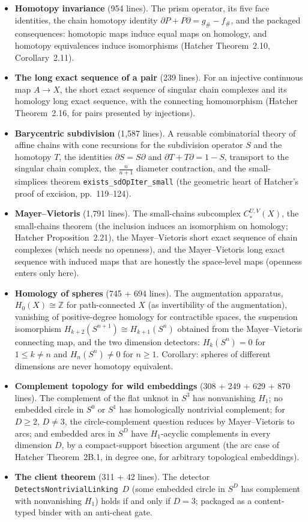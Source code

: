 \documentclass[11pt]{article}
\theoremstyle{remark}
\newcommand{\Z}{\mathbb{Z}}
\newcommand{\leanname}[1]{\texttt{#1}}
\begin{document}
\begin{itemize}
\item \textbf{Homotopy invariance} (954 lines). The prism operator, its five
  face identities, the chain homotopy identity
  $\partial P + P\partial = g_\# - f_\#$, and the packaged consequences:
  homotopic maps induce equal maps on homology, and homotopy equivalences
  induce isomorphisms (Hatcher Theorem~2.10, Corollary~2.11).
\item \textbf{The long exact sequence of a pair} (239 lines). For an
  injective continuous map $A \to X$, the short exact sequence of singular
  chain complexes and its homology long exact sequence, with the connecting
  homomorphism (Hatcher Theorem~2.16, for pairs presented by injections).
\item \textbf{Barycentric subdivision} (1{,}587 lines). A reusable
  combinatorial theory of affine chains with cone recursions for the
  subdivision operator $S$ and the homotopy $T$, the identities
  $\partial S = S \partial$ and $\partial T + T\partial = 1 - S$, transport
  to the singular chain complex, the $\tfrac{n}{n+1}$ diameter contraction,
  and the small-simplices theorem \leanname{exists\_sdOpIter\_small}
  (the geometric heart of Hatcher's proof of excision, pp.~119--124).
\item \textbf{Mayer--Vietoris} (1{,}791 lines). The small-chains subcomplex
  $C^{U,V}_*(X)$, the small-chains theorem (the inclusion induces an
  isomorphism on homology; Hatcher Proposition~2.21), the Mayer--Vietoris
  short exact sequence of chain complexes (which needs no openness), and the
  Mayer--Vietoris long exact sequence with induced maps that are honestly the
  space-level maps (openness enters only here).
\item \textbf{Homology of spheres} (745 + 694 lines). The augmentation
  apparatus, $H_0(X) \cong \Z$ for path-connected $X$ (as invertibility of
  the augmentation), vanishing of positive-degree homology for contractible
  spaces, the suspension isomorphism
  $H_{k+2}(S^{n+1}) \cong H_{k+1}(S^{n})$ obtained from the Mayer--Vietoris
  connecting map, and the two dimension detectors: $H_k(S^n) = 0$ for
  $1 \le k \ne n$ and $H_n(S^n) \ne 0$ for $n \ge 1$. Corollary: spheres of
  different dimensions are never homotopy equivalent.
\item \textbf{Complement topology for wild embeddings} (308 + 249 + 629 +
  870 lines). The complement of the flat unknot in $S^3$ has nonvanishing
  $H_1$; no embedded circle in $S^0$ or $S^1$ has homologically nontrivial
  complement; for $D \ge 2$, $D \ne 3$, the circle-complement question
  reduces by Mayer--Vietoris to arcs; and embedded arcs in $S^D$ have
  $H_1$-acyclic complements in every dimension $D$, by a compact-support
  bisection argument (the arc case of Hatcher Theorem~2B.1, in degree one,
  for arbitrary topological embeddings).
\item \textbf{The client theorem} (311 + 42 lines). The detector
  \leanname{DetectsNontrivialLinking}~$D$ (some embedded circle in $S^D$
  has complement with nonvanishing $H_1$) holds if and only if $D = 3$;
  packaged as a content-typed binder with an anti-cheat gate.
\end{itemize}
\end{document}
